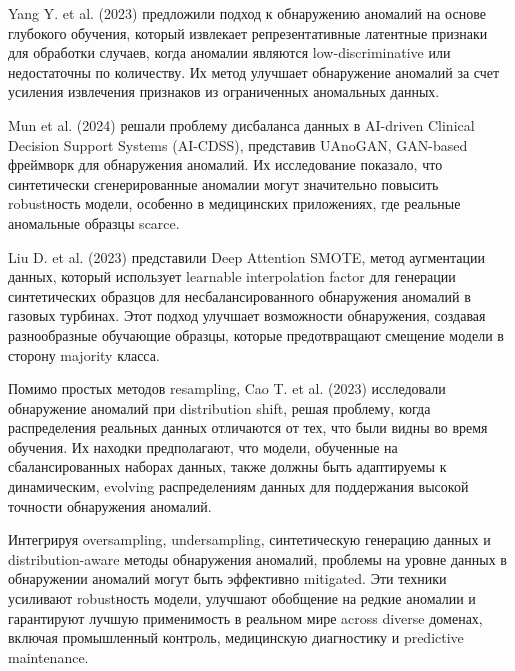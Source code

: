 \documentclass[14pt,a4paper]{article}
\begin{document}
Yang Y. et al. (2023) предложили подход к обнаружению аномалий на основе глубокого обучения, который извлекает репрезентативные латентные признаки для обработки случаев, когда аномалии являются low-discriminative или недостаточны по количеству. Их метод улучшает обнаружение аномалий за счет усиления извлечения признаков из ограниченных аномальных данных.

Mun et al. (2024) решали проблему дисбаланса данных в AI-driven Clinical Decision Support Systems (AI-CDSS), представив UAnoGAN, GAN-based фреймворк для обнаружения аномалий. Их исследование показало, что синтетически сгенерированные аномалии могут значительно повысить robustность модели, особенно в медицинских приложениях, где реальные аномальные образцы scarce.

Liu D. et al. (2023) представили Deep Attention SMOTE, метод аугментации данных, который использует learnable interpolation factor для генерации синтетических образцов для несбалансированного обнаружения аномалий в газовых турбинах. Этот подход улучшает возможности обнаружения, создавая разнообразные обучающие образцы, которые предотвращают смещение модели в сторону majority класса.

Помимо простых методов resampling, Cao T. et al. (2023) исследовали обнаружение аномалий при distribution shift, решая проблему, когда распределения реальных данных отличаются от тех, что были видны во время обучения. Их находки предполагают, что модели, обученные на сбалансированных наборах данных, также должны быть адаптируемы к динамическим, evolving распределениям данных для поддержания высокой точности обнаружения аномалий.

Интегрируя oversampling, undersampling, синтетическую генерацию данных и distribution-aware методы обнаружения аномалий, проблемы на уровне данных в обнаружении аномалий могут быть эффективно mitigated. Эти техники усиливают robustность модели, улучшают обобщение на редкие аномалии и гарантируют лучшую применимость в реальном мире across diverse доменах, включая промышленный контроль, медицинскую диагностику и predictive maintenance.
\end{document}
